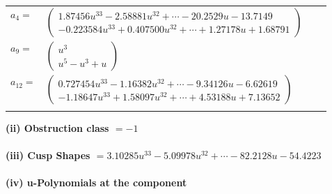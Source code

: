 \documentclass[1p]{elsarticle_modified}
\theoremstyle{definition}
\begin{document}
\begin{tabular}{m{7pt} m{180pt} m{7pt} m{180pt} }
\flushright $a_{4}=$&$\begin{pmatrix}1.87456 u^{33}-2.58881 u^{32}+\cdots-20.2529 u-13.7149\\-0.223584 u^{33}+0.407500 u^{32}+\cdots+1.27178 u+1.68791\end{pmatrix}$ \\
\flushright $a_{9}=$&$\begin{pmatrix}u^3\\u^5- u^3+u\end{pmatrix}$ \\
\flushright $a_{12}=$&$\begin{pmatrix}0.727454 u^{33}-1.16382 u^{32}+\cdots-9.34126 u-6.62619\\-1.18647 u^{33}+1.58097 u^{32}+\cdots+4.53188 u+7.13652\end{pmatrix}$\\&\end{tabular}
\flushleft \textbf{(ii) Obstruction class $= -1$}\\~\\
\flushleft \textbf{(iii) Cusp Shapes $= 3.10285 u^{33}-5.09978 u^{32}+\cdots-82.2128 u-54.4223$}\\~\\
\newpage\renewcommand{\arraystretch}{1}
\flushleft \textbf{(iv) u-Polynomials at the component}\newline \\
\end{document}
